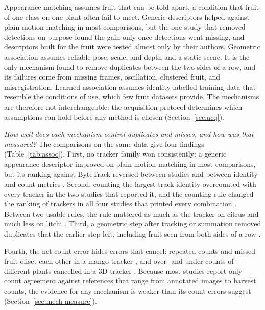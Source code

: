 Appearance matching assumes fruit that can be told apart, a condition that fruit of one class on one plant often fail to meet. Generic descriptors helped against plain motion matching in most comparisons, but the one study that removed detections on purpose found the gain only once detections went missing, and descriptors built for the fruit were tested almost only by their authors. Geometric association assumes reliable pose, scale, and depth and a static scene. It is the only mechanism found to remove duplicates between the two sides of a row, and its failures come from missing frames, oscillation, clustered fruit, and misregistration. Learned association assumes identity-labelled training data that resemble the conditions of use, which few fruit datasets provide. The mechanisms are therefore not interchangeable: the acquisition protocol determines which assumptions can hold before any method is chosen (Section~\ref{sec:acq}).

\textit{How well does each mechanism control duplicates and misses, and how was that measured?} The comparisons on the same data give four findings (Table~\ref{tab:assoc}). First, no tracker family won consistently: a generic appearance descriptor improved on plain motion matching in most comparisons, but its ranking against ByteTrack reversed between studies and between identity and count metrics \citep{villacres2023apple,genemola2023video,qi2025assessment}. Second, counting the largest track identity overcounted with every tracker in the two studies that reported it, and the counting rule changed the ranking of trackers in all four studies that printed every combination \citep{zhou2024advancing,zhang2025row,zheng2023efficient,matos2024tracking}. Between two usable rules, the rule mattered as much as the tracker on citrus and much less on litchi \citep{zheng2023efficient,lu2025iot}. Third, a geometric step after tracking or summation removed duplicates that the earlier step left, including fruit seen from both sides of a row \citep{liu2018robust,hani2020comparative}.

Fourth, the net count error hides errors that cancel: repeated counts and missed fruit offset each other in a mango tracker \citep{wang2019mango}, and over- and under-counts of different plants cancelled in a 3D tracker \citep{rapadorincon2023development}. Because most studies report only count agreement against references that range from annotated images to harvest counts, the evidence for any mechanism is weaker than its count errors suggest (Section~\ref{sec:mech-measure}).


